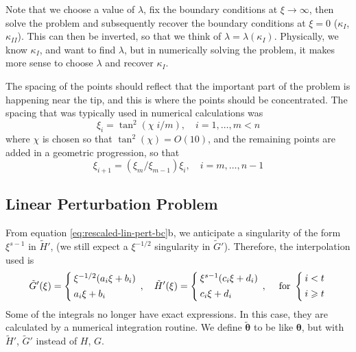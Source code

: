 \documentclass{jfm}
\begin{document}
Note that we choose a value of $\lambda$, fix the boundary conditions
at $\xi \to \infty$, then solve the problem and subsequently recover
the boundary conditions at $\xi=0$ ($\kappa_I$, $\kappa_{II}$).
This can then be inverted, so that we think of $\lambda = \lambda(\kappa_I)$.
Physically, we know $\kappa_I$, and want to find $\lambda$, but in numerically
solving the problem, it makes more sense to choose $\lambda$ and recover 
$\kappa_I$.

The spacing of the points should reflect that the important 
part of the problem is happening near the tip, and this is where the points
should be concentrated. The spacing that was typically used in numerical 
calculations was 
\begin{equation}
\xi_i = \tan^2( \chi \; i/m ), \quad i=1,\dots,m < n
\end{equation}
where $\chi$ is chosen so that $\tan^2(\chi) = O(10)$, and the remaining points
are added in a geometric progression, so that 
\begin{equation}
\xi_{i+1} = (\xi_m/\xi_{m-1})\xi_{i} , \quad i = m,\dots,n-1
\end{equation}
%
%
\subsection{Linear Perturbation Problem}
%
%
From equation \ref{eq:rescaled-lin-pert-bc}b, we anticipate a 
singularity of the form $\xi^{s-1}$ in $\tilde{H}'$, (we still expect a
$\xi^{-1/2}$ singularity in $\tilde{G}'$). Therefore, the
interpolation used is
\begin{equation}
\setlength{\arraycolsep}{2pt}
\tilde{G}'(\xi) = \left\{ \begin{array}{l}  
\xi^{-1/2}(a_i \xi + b_i) \\[4pt]
a_i \xi + b_i
 \end{array}\right., \quad
\tilde{H}'(\xi) = \left\{ \begin{array}{l}  
\xi^{s-1}(c_i \xi + d_i) \\[4pt]
c_i \xi + d_i
 \end{array}\right. , \quad
\; \mbox{for\ } \left\{ \begin{array}{l}  
i<t\\[4pt]
i\geq t
\end{array}\right.
\end{equation}
Some of the integrals no longer have exact expressions. In this case, they are
calculated by a numerical integration routine. We define 
$\tilde{\boldsymbol{\theta}}$ to be like $\boldsymbol{\theta}$, but with $\tilde{H}'$,
$\tilde{G}'$ instead of $H$, $G$.
\end{document}
